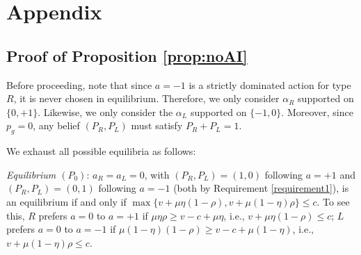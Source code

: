 \documentclass[english,12pt]{article}
\theoremstyle{plain}
\theoremstyle{plain}
\theoremstyle{definition}
\theoremstyle{definition}
\theoremstyle{assumption}
\theoremstyle{plain}
\theoremstyle{plain}
\theoremstyle{plain}
\theoremstyle{plain}
\theoremstyle{definition}%
\theoremstyle{plain}
\theoremstyle{plain}
\theoremstyle{plain}
\theoremstyle{plain}
\theoremstyle{plain}
\theoremstyle{plain}
\begin{document}
\newpage
\appendix
\section{Appendix}

\subsection{Proof of Proposition \ref{prop:noAI}}

Before proceeding, note that since $a=-1$ is a strictly dominated action for type $R$, it is never chosen in equilibrium. Therefore, we only consider $\alpha_R$ supported on $\{0,+1\}$. Likewise, we only consider the $\alpha_L$ supported on $\{-1,0\}$. Moreover, since $p_g=0$, any belief $(P_R,P_L)$ must satisfy $P_R+P_L=1$.

We exhaust all possible equilibria as follows:

\textit{Equilibrium $(P_0)$}: $a_R=a_L=0$, with $(P_R,P_L)=(1,0)$ following $a=+1$ and $(P_R,P_L)=(0,1)$ following $a=-1$ (both by Requirement \ref{requirement1}), is an equilibrium if and only if $\max\{v+\mu\eta(1-\rho), v+\mu(1-\eta)\rho\}\leq c$. To see this, $R$ prefers $a=0$ to $a=+1$ if $\mu\eta\rho\geq v-c+\mu\eta$, i.e., $v+\mu\eta(1-\rho)\leq c$; $L$ prefers $a=0$ to $a=-1$ if $\mu(1-\eta)(1-\rho)\geq v-c+\mu(1-\eta)$, i.e., $v+\mu(1-\eta)\rho\leq c$.
\end{document}
